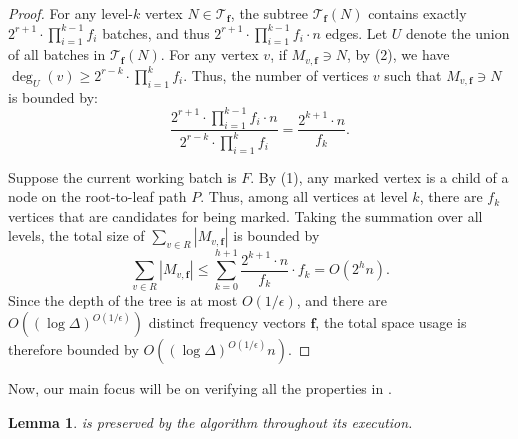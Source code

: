 \documentclass[11pt,a4paper]{article}
\newtheorem{lemma}{Lemma}[section]
\newcommand{\tree}{\mathcal{T}}
\newcommand{\freq}{\mathbf{f}}
\begin{document}
\begin{proof}
    For any level-$k$ vertex $N \in \tree_\freq$, the subtree $ \tree_{\freq}(N) $ contains exactly $ 2^{r+1} \cdot \prod_{i=1}^{k-1} f_i $ batches, and thus $ 2^{r+1} \cdot \prod_{i=1}^{k-1} f_i \cdot n$ edges. 
    Let $U$ denote the union of all batches in $ \tree_{\freq}(N) $. For any vertex $v$, if $M_{v, \freq} \ni N$, by (2), we have $\deg_U(v) \geq 2^{r-k} \cdot \prod_{i=1}^k f_i$. 	
	Thus, the number of vertices $v$ such that $ M_{v, \freq} \ni N$ is bounded by: 
	$$
	\frac{2^{r+1} \cdot \prod_{i=1}^{k-1} f_i \cdot n}{2^{r-k} \cdot \prod_{i=1}^k f_i} = \frac{2^{k+1} \cdot n}{f_k}.
	$$

    Suppose the current working batch is $F$. By (1), any marked vertex is a child of a node on the root-to-leaf path $P$. Thus, among all vertices at level $k$, there are $f_k$ vertices that are candidates for being marked. 
	Taking the summation over all levels, the total size of $ \sum_{v \in R} |M_{v, \freq}| $ is bounded by
	$$
	\sum_{v \in R} |M_{v, \freq}|   
	\le \sum_{k = 0}^{h + 1}   \frac{2^{k + 1} \cdot n}{f_k} \cdot f_k    
	= O(2^h n). 
	$$
    Since the depth of the tree is at most $O(1/\epsilon)$, and there are $O( (\log \Delta)^{O(1 / \epsilon)})$ distinct frequency vectors $\freq$, the total space usage is therefore bounded by $O((\log\Delta)^{O(1/\epsilon)} n)$.
    \qedhere
\end{proof}
Now, our main focus will be on verifying all the properties in .
\begin{lemma}\label{verify-inv}
	 is preserved by the algorithm throughout its execution.
\end{lemma}
\end{document}

